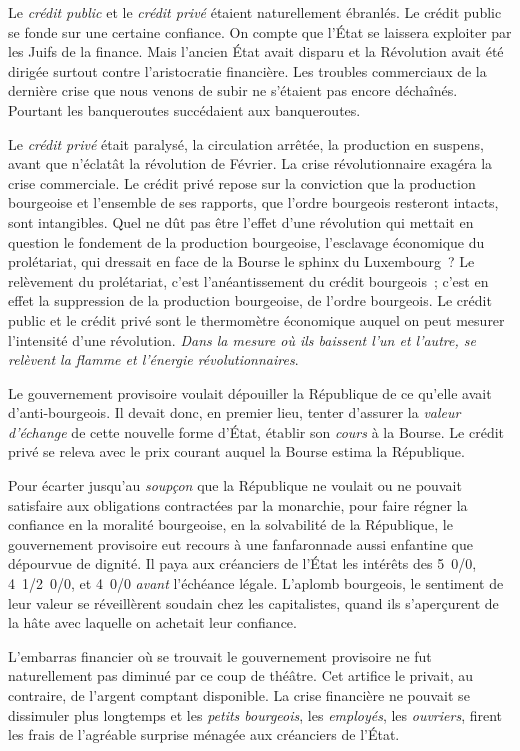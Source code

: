 \documentclass[french,twoside]{book} %
\begin{document}
Le \emph{crédit public} et le \emph{crédit privé} étaient naturellement ébranlés. Le crédit public se fonde sur une certaine confiance. On compte que l’État se laissera exploiter par les Juifs de la finance. Mais l’ancien État avait disparu et la Révolution avait été dirigée surtout contre l’aristocratie financière. Les troubles commerciaux de la dernière crise que nous venons de subir ne s’étaient pas encore déchaînés. Pourtant les banqueroutes succédaient aux banqueroutes.\par
Le \emph{crédit privé} était paralysé, la circulation arrêtée, la production en suspens, avant que n’éclatât la révolution de Février. La crise révolutionnaire exagéra la crise commerciale. Le crédit privé repose sur la conviction que la production bourgeoise et l’ensemble de ses rapports, que l’ordre bourgeois resteront intacts, sont intangibles. Quel ne dût pas être l’effet d’une révolution qui mettait en question le fondement de la production bourgeoise, l’esclavage économique du prolétariat, qui dressait en face de la Bourse le sphinx du Luxembourg ? Le relèvement du prolétariat, c’est l’anéantissement du crédit bourgeois ; c’est en effet la suppression de la production bourgeoise, de l’ordre bourgeois. Le crédit public et le crédit privé sont le thermomètre économique auquel on peut mesurer l’intensité d’une révolution. \emph{Dans la mesure où ils baissent l’un et l’autre, se relèvent la flamme et l’énergie révolutionnaires}.\par
Le gouvernement provisoire voulait dépouiller la République de ce qu’elle avait d’anti-bourgeois. Il devait donc, en premier lieu, tenter d’assurer la \emph{valeur d’échange} de cette nouvelle forme d’État, établir son \emph{cours} à la Bourse. Le crédit privé se releva avec le prix courant auquel la Bourse estima la République.\par
Pour écarter jusqu’au \emph{soupçon} que la République ne voulait ou ne pouvait satisfaire aux obligations contractées par la monarchie, pour faire régner la confiance en la moralité bourgeoise, en la solvabilité de la République, le gouvernement provisoire eut recours à une fanfaronnade aussi enfantine que dépourvue de dignité. Il paya aux créanciers de l’État les intérêts des 5 0/0, 4 1/2 0/0, et 4 0/0 \emph{avant} l’échéance légale. L’aplomb bourgeois, le sentiment de leur valeur se réveillèrent soudain chez les capitalistes, quand ils s’aperçurent de la hâte avec laquelle on achetait leur confiance.\par
L’embarras financier où se trouvait le gouvernement provisoire ne fut naturellement pas diminué par ce coup de théâtre. Cet artifice le privait, au contraire, de l’argent comptant disponible. La crise financière ne pouvait se dissimuler plus longtemps et les \emph{petits bourgeois}, les \emph{employés}, les \emph{ouvriers}, firent les frais de l’agréable surprise ménagée aux créanciers de l’État.\par
\end{document}
